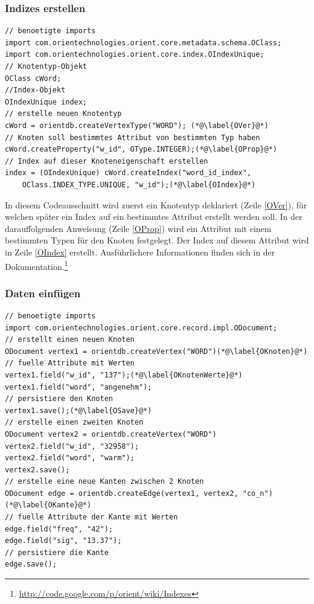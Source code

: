 \documentclass[11pt, a4paper, oneside]{article} %
\begin{document}
\subsubsection{Indizes erstellen}

\begin{lstlisting}[caption={OrientDB - Indizes erstellen}]
// benoetigte imports
import com.orientechnologies.orient.core.metadata.schema.OClass;
import com.orientechnologies.orient.core.index.OIndexUnique;
// Knotentyp-Objekt
OClass cWord;
//Index-Objekt
OIndexUnique index;
// erstelle neuen Knotentyp
cWord = orientdb.createVertexType("WORD"); (*@\label{OVer}@*)
// Knoten soll bestimmtes Attribut von bestimmten Typ haben
cWord.createProperty("w_id", OType.INTEGER);(*@\label{OProp}@*)
// Index auf dieser Knoteneigenschaft erstellen
index = (OIndexUnique) cWord.createIndex("word_id_index",
	OClass.INDEX_TYPE.UNIQUE, "w_id");(*@\label{OIndex}@*)
\end{lstlisting}

In diesem Codeausschnitt wird zuerst ein Knotentyp deklariert (Zeile \ref{OVer}), für welchen später ein Index auf ein bestimmtes Attribut erstellt werden soll. In der darauffolgenden Anweisung (Zeile \ref{OProp}) wird ein Attribut mit einem bestimmten Typen für den Knoten festgelegt. Der Index auf diesem Attribut wird in Zeile \ref{OIndex} erstellt. 
Ausführlichere Informationen finden sich in der Dokumentation.\footnote{\url{http://code.google.com/p/orient/wiki/Indexes}}

\subsubsection{Daten einfügen}

\begin{lstlisting}[caption={OrientDB - Daten einfügen}]
// benoetigte imports
import com.orientechnologies.orient.core.record.impl.ODocument;
// erstellt einen neuen Knoten
ODocument vertex1 = orientdb.createVertex("WORD")(*@\label{OKnoten}@*)
// fuelle Attribute mit Werten
vertex1.field("w_id", "137");(*@\label{OKnotenWerte}@*)
vertex1.field("word", "angenehm");
// persistiere den Knoten
vertex1.save();(*@\label{OSave}@*)
// erstelle einen zweiten Knoten
ODocument vertex2 = orientdb.createVertex("WORD")
vertex2.field("w_id", "32958");
vertex2.field("word", "warm");
vertex2.save();
// erstelle eine neue Kanten zwischen 2 Knoten
ODocument edge = orientdb.createEdge(vertex1, vertex2, "co_n")(*@\label{OKante}@*)
// fuelle Attribute der Kante mit Werten
edge.field("freq", "42");
edge.field("sig", "13.37");
// persistiere die Kante
edge.save();
\end{lstlisting}
\end{document}
